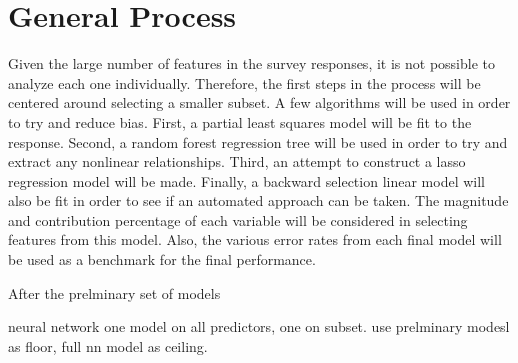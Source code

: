 {\section*{General Process}}

Given the large number of features in the survey responses, it is not possible to analyze each one individually.  Therefore, the first steps in the process will be centered around selecting a smaller subset.  A few algorithms will be used in order to try and reduce bias.  First, a partial least squares model will be fit to the response.  Second, a random forest regression tree will be used in order to try and extract any nonlinear relationships.  Third, an attempt to construct a lasso regression model will be made.  Finally, a backward selection linear model will also be fit in order to see if an automated approach can be taken.  The magnitude and contribution percentage of each variable will be considered in selecting features from this model.  Also, the various error rates from each final model will be used as a benchmark for the final performance.

After the prelminary set of models 



neural network one model on all predictors, one on subset.  use prelminary modesl as floor, full nn model as ceiling.